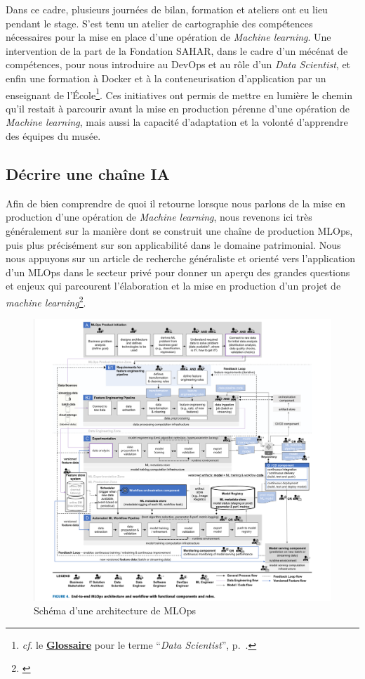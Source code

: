 Dans ce cadre, plusieurs journées de bilan, formation et ateliers ont eu lieu pendant le stage. S'est tenu un atelier de cartographie des compétences nécessaires pour la mise en place d'une opération de \textit{Machine learning}. Une intervention de la part de la Fondation SAHAR, dans le cadre d'un mécénat de compétences, pour nous introduire au DevOps et au rôle d'un \textit{Data Scientist}, et enfin une formation à Docker et à la conteneurisation d'application par un enseignant de l'École\footnote{\textit{cf}. le \textbf{\hyperref[sec:Glossaire]{Glossaire}} pour le terme \enquote{\textit{Data Scientist}}, p.~\pageref{sec:Glossaire}.}. Ces initiatives ont permis de mettre en lumière le chemin qu'il restait à parcourir avant la mise en production pérenne d'une opération de \textit{Machine learning}, mais aussi la capacité d'adaptation et la volonté d'apprendre des équipes du musée.

\subsection{Décrire une chaîne IA}

Afin de bien comprendre de quoi il retourne lorsque nous parlons de la mise en production d'une opération de \textit{Machine learning}, nous revenons ici très généralement sur la manière dont se construit une chaîne de production MLOps, puis plus précisément sur son applicabilité dans le domaine patrimonial. Nous nous appuyons sur un article de recherche généraliste et orienté vers l'application d'un MLOps dans le secteur privé pour donner un aperçu des grandes questions et enjeux qui parcourent l'élaboration et la mise en production d'un projet de \textit{machine learning}\footnote{\cite{kreuzberger_machine_2023}}. 

\begin{figure}[H]
    \centering
    \includegraphics[width=1.08\linewidth]{Illustrations/MLOps.png}
    \caption{Schéma d'une architecture de MLOps}
    \label{fig:placeholder}
\end{figure}

